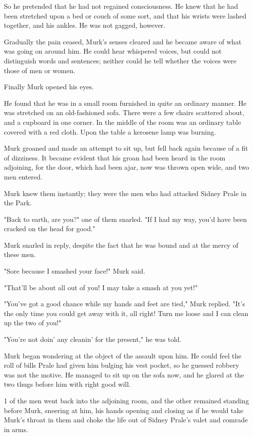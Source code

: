 \documentclass{novel}
\begin{document}
So he pretended that he had not regained consciousness. He knew that he had been stretched upon a bed or couch of some sort, and that his wrists were lashed together, and his ankles. He was not gagged, however.

Gradually the pain ceased, Murk's senses cleared and he became aware of what was going on around him. He could hear whispered voices, but could not distinguish words and sentences; neither could he tell whether the voices were those of men or women.

Finally Murk opened his eyes.

He found that he was in a small room furnished in quite an ordinary manner. He was stretched on an old-fashioned sofa. There were a few chairs scattered about, and a cupboard in one corner. In the middle of the room was an ordinary table covered with a red cloth. Upon the table a kerosene lamp was burning.

Murk groaned and made an attempt to sit up, but fell back again because of a fit of dizziness. It became evident that his groan had been heard in the room adjoining, for the door, which had been ajar, now was thrown open wide, and two men entered.

Murk knew them instantly; they were the men who had attacked Sidney Prale in the Park.

"Back to earth, are you?" one of them snarled. "If I had my way, you'd have been cracked on the head for good."

Murk snarled in reply, despite the fact that he was bound and at the mercy of these men.

"Sore because I smashed your face!" Murk said.

"That'll be about all out of you! I may take a smash at you yet!"

"You've got a good chance while my hands and feet are tied," Murk replied. "It's the only time you could get away with it, all right! Turn me loose and I can clean up the two of you!"

"You're not doin' any cleanin' for the present," he was told.

Murk began wondering at the object of the assault upon him. He could feel the roll of bills Prale had given him bulging his vest pocket, so he guessed robbery was not the motive. He managed to sit up on the sofa now, and he glared at the two thugs before him with right good will.

1 of the men went back into the adjoining room, and the other remained standing before Murk, sneering at him, his hands opening and closing as if he would take Murk's throat in them and choke the life out of Sidney Prale's valet and comrade in arms.
\end{document}
